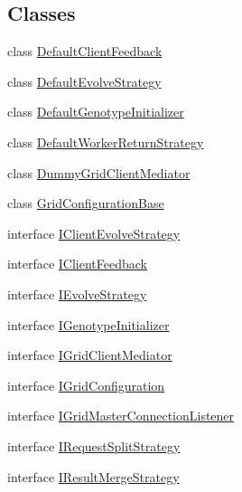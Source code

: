 \subsection*{Classes}
\begin{DoxyCompactItemize}
\item 
class \hyperlink{classorg_1_1jgap_1_1distr_1_1grid_1_1_default_client_feedback}{Default\-Client\-Feedback}
\item 
class \hyperlink{classorg_1_1jgap_1_1distr_1_1grid_1_1_default_evolve_strategy}{Default\-Evolve\-Strategy}
\item 
class \hyperlink{classorg_1_1jgap_1_1distr_1_1grid_1_1_default_genotype_initializer}{Default\-Genotype\-Initializer}
\item 
class \hyperlink{classorg_1_1jgap_1_1distr_1_1grid_1_1_default_worker_return_strategy}{Default\-Worker\-Return\-Strategy}
\item 
class \hyperlink{classorg_1_1jgap_1_1distr_1_1grid_1_1_dummy_grid_client_mediator}{Dummy\-Grid\-Client\-Mediator}
\item 
class \hyperlink{classorg_1_1jgap_1_1distr_1_1grid_1_1_grid_configuration_base}{Grid\-Configuration\-Base}
\item 
interface \hyperlink{interfaceorg_1_1jgap_1_1distr_1_1grid_1_1_i_client_evolve_strategy}{I\-Client\-Evolve\-Strategy}
\item 
interface \hyperlink{interfaceorg_1_1jgap_1_1distr_1_1grid_1_1_i_client_feedback}{I\-Client\-Feedback}
\item 
interface \hyperlink{interfaceorg_1_1jgap_1_1distr_1_1grid_1_1_i_evolve_strategy}{I\-Evolve\-Strategy}
\item 
interface \hyperlink{interfaceorg_1_1jgap_1_1distr_1_1grid_1_1_i_genotype_initializer}{I\-Genotype\-Initializer}
\item 
interface \hyperlink{interfaceorg_1_1jgap_1_1distr_1_1grid_1_1_i_grid_client_mediator}{I\-Grid\-Client\-Mediator}
\item 
interface \hyperlink{interfaceorg_1_1jgap_1_1distr_1_1grid_1_1_i_grid_configuration}{I\-Grid\-Configuration}
\item 
interface \hyperlink{interfaceorg_1_1jgap_1_1distr_1_1grid_1_1_i_grid_master_connection_listener}{I\-Grid\-Master\-Connection\-Listener}
\item 
interface \hyperlink{interfaceorg_1_1jgap_1_1distr_1_1grid_1_1_i_request_split_strategy}{I\-Request\-Split\-Strategy}
\item 
interface \hyperlink{interfaceorg_1_1jgap_1_1distr_1_1grid_1_1_i_result_merge_strategy}{I\-Result\-Merge\-Strategy}

\end{DoxyCompactItemize}
